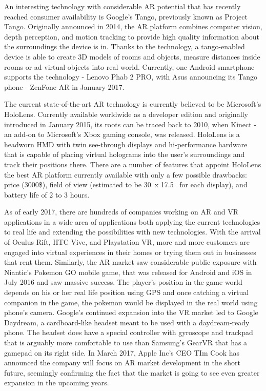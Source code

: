 \documentclass[12pt, a4paper]{article}
\begin{document}

An interesting technology with considerable AR potential that has recently reached consumer availability is Google’s Tango, previously known as Project Tango. Originally announced in 2014, the AR platform combines computer vision, depth perception, and motion tracking to provide high quality information about the surroundings the device is in. Thanks to the technology, a tango-enabled device is able to create 3D models of rooms and objects, measure distances inside rooms or ad virtual objects into real world. Currently, one Android smartphone supports the technology - Lenovo Phab 2 PRO, with Asus announcing its Tango phone - ZenFone AR in January 2017.

The current state-of-the-art AR technology is currently believed to be Microsoft’s HoloLens. Currently available worldwide as a developer edition and originally introduced in January 2015, its roots can be traced back to 2010, when Kinect - an add-on to Microsoft’s Xbox gaming console, was released. HoloLens is a headworn HMD with twin see-through displays and hi-performance hardware that is capable of placing virtual holograms into the user’s surroundings and track their positions there. There are a number of features that appoint HoloLens the best AR platform currently available with only a few possible drawbacks: price (3000\$), field of view (estimated to be 30\degree~x 17.5\degree~ for each display), and battery life of 2 to 3 hours. 


As of early 2017, there are hundreds of companies working on AR and VR applications in a wide area of applications both applying the current technologies to real life and extending the possibilities with new technologies. With the arrival of Oculus Rift, HTC Vive, and Playstation VR, more and more customers are engaged into virtual experiences in their homes or trying them out in businesses that rent them. Similarly, the AR market saw considerable public exposure with Niantic’s Pokemon GO mobile game, that was released for Android and iOS in July 2016 and saw massive success. The player’s position in the game world depends on his or her real life position using GPS and once catching a virtual companion in the game, the pokemon would be displayed in the real world using phone’s camera. Google’s continued expansion into the VR market led to Google Daydream, a cardboard-like headset meant to be used with a daydream-ready phone. The headset does have a special controller with gyroscope and trackpad that is arguably more comfortable to use than Samsung’s GearVR that has a gamepad on its right side. In March 2017, Apple Inc’s CEO TIm Cook has announced the company will focus on AR market development in the short future, seemingly confirming the fact that the market is going to see even greater expansion in the upcoming years.
\end{document}
